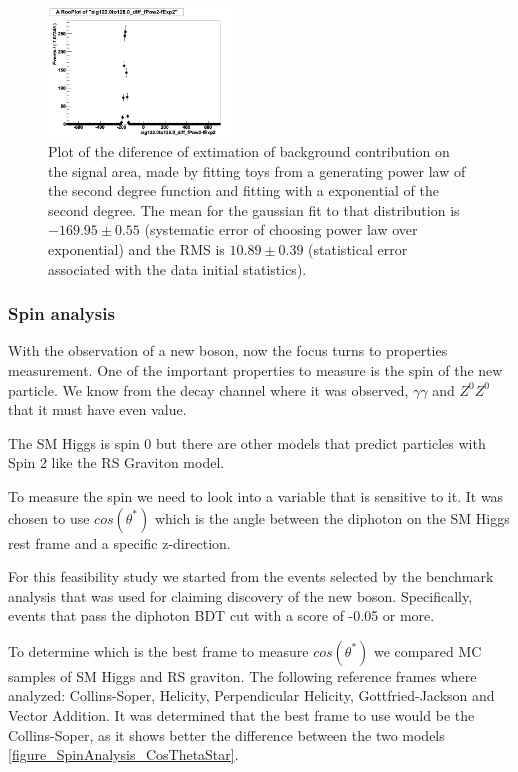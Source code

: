 \documentclass[%
reprint,
amsmath,
amssymb,
aps,
pra,
showkeys
]{revtex4-1}
\begin{document}
\begin{figure}[ht]
\centering
\includegraphics[width=0.45\textwidth]{img/sig122to128_Truth-fPow2_vs_fExp2.png}
\caption{Plot of the diference of extimation of background contribution on the signal area, made by fitting toys from a generating
power law of the second degree function and fitting with a exponential of the second degree. The mean for the gaussian fit to that
distribution is $-169.95\pm0.55$ (systematic error of choosing power law over exponential) and the RMS is $10.89\pm0.39$ (statistical 
error associated with the data initial statistics).}
\label{figure_SystematicAnalysis_Plot}
\end{figure}

\subsubsection{Spin analysis}

With the observation of a new boson, now the focus turns to properties measurement. One of the important properties
to measure is the spin of the new particle. We know from the decay channel where it was observed, $\gamma\gamma$ 
and $Z^0Z^0$ that it must have even value.

The SM Higgs is spin 0 but there are other models that predict particles with Spin 2 like the RS Graviton model.

To measure the spin we need to look into a variable that is sensitive to it. It was chosen to use $cos(\theta^{*})$ 
which is the angle between the diphoton on the SM Higgs rest frame and a specific z-direction.

For this feasibility study we started from the events selected by the benchmark analysis that was used for claiming 
discovery of the new boson. Specifically, events that pass the diphoton BDT cut with a score of -0.05 or more.

To determine which is the best frame to measure $cos(\theta^{*})$ we compared MC samples of SM Higgs and RS graviton. 
The following reference frames where analyzed: Collins-Soper, Helicity, Perpendicular Helicity, Gottfried-Jackson and 
Vector Addition. It was determined that the best frame to use would be the Collins-Soper, as it shows better the 
difference between the two models \ref{figure_SpinAnalysis_CosThetaStar}.
\end{document}
